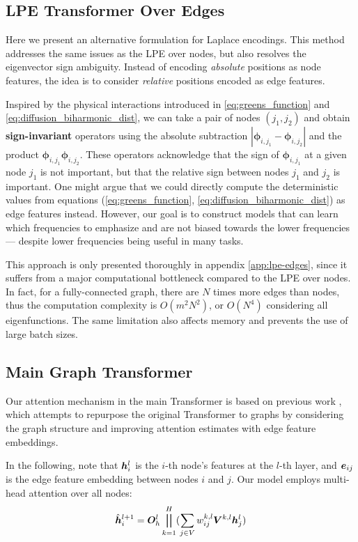 \documentclass{article}
\def\eigvec{{\bm{\phi}}}
\begin{document}
\subsection{LPE Transformer Over Edges}
\label{sec:lpe-edges}

Here we present an alternative formulation for Laplace encodings. This method addresses the same issues as the LPE over nodes, but also resolves the eigenvector sign ambiguity. Instead of encoding \textit{absolute} positions as node features, the idea is to consider \textit{relative} positions encoded as edge features.

Inspired by the physical interactions introduced in \ref{eq:greens_function} and \ref{eq:diffusion_biharmonic_dist}, we can take a pair of nodes $(j_1, j_2)$ and obtain \textbf{sign-invariant} operators 
using the absolute subtraction $|\eigvec_{i,j_1} - \eigvec_{i,j_2}|$ and the product $\eigvec_{i,j_1} \eigvec_{i,j_2}$. 
These operators acknowledge that the sign of $\eigvec_{i, j_1}$ at a given node $j_1$ is not important, but that the relative sign between nodes $j_1$ and $j_2$ is important. One might argue that we could directly compute the deterministic values from equations (\ref{eq:greens_function}, \ref{eq:diffusion_biharmonic_dist}) as edge features instead. However, our goal is to construct models that can learn which frequencies to emphasize and are not biased towards the lower frequencies --- despite lower frequencies being useful in many tasks.


This approach is only presented thoroughly in appendix \ref{app:lpe-edges}, since it suffers from a major computational bottleneck compared to the LPE over nodes. In fact, for a fully-connected graph, there are $N$ times more edges than nodes, thus the computation complexity is $O(m^2 N^2)$, or $O(N^4)$ considering all eigenfunctions. The same limitation also affects memory and prevents the use of large batch sizes.



\subsection{Main Graph Transformer}


Our attention mechanism in the main Transformer is based on previous work \cite{dwivedi2020generalization}, which attempts to repurpose the original Transformer to graphs by considering the graph structure and improving attention estimates with edge feature embeddings.

In the following, note that ${\bm{h}}^l_i$ is the $i$-th node's features at the $l$-th layer, and ${\bm{e}}_{ij}$ is the edge feature embedding between nodes $i$ and $j$. Our model employs multi-head attention over all nodes:
\begin{equation}
\label{eq:multi-head}
    \hat{{\bm{h}}}_i^{l+1}= {\bm{O}}_h^l \bigparallel_{k=1}^H (\sum_{j \in V} w_{ij}^{k,l}{\bm{V}}^{k,l}{\bm{h}}_{j}^l)
\end{equation} 
\end{document}
